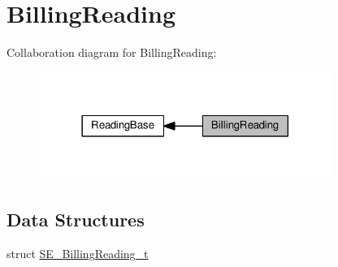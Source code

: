 \hypertarget{group__BillingReading}{}\section{Billing\+Reading}
\label{group__BillingReading}
Collaboration diagram for Billing\+Reading\+:\nopagebreak
\begin{figure}[H]
\begin{center}
\leavevmode
\includegraphics[width=270pt]{group__BillingReading}
\end{center}
\end{figure}
\subsection*{Data Structures}
\begin{DoxyCompactItemize}
\item 
struct \hyperlink{structSE__BillingReading__t}{S\+E\+\_\+\+Billing\+Reading\+\_\+t}
\end{DoxyCompactItemize}
